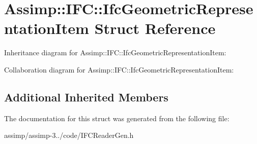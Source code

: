 \hypertarget{struct_assimp_1_1_i_f_c_1_1_ifc_geometric_representation_item}{\section{Assimp\+:\+:I\+F\+C\+:\+:Ifc\+Geometric\+Representation\+Item Struct Reference}
\label{struct_assimp_1_1_i_f_c_1_1_ifc_geometric_representation_item}
}


Inheritance diagram for Assimp\+:\+:I\+F\+C\+:\+:Ifc\+Geometric\+Representation\+Item\+:


Collaboration diagram for Assimp\+:\+:I\+F\+C\+:\+:Ifc\+Geometric\+Representation\+Item\+:
\subsection*{Additional Inherited Members}


The documentation for this struct was generated from the following file\+:\begin{DoxyCompactItemize}
\item 
assimp/assimp-\/3../code/I\+F\+C\+Reader\+Gen.\+h\end{DoxyCompactItemize}
